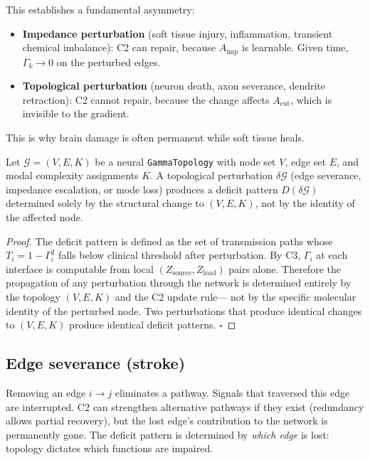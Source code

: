 \documentclass[aps,pre,twocolumn,superscriptaddress,floatfix]{revtex4-2}
\begin{document}
This establishes a fundamental asymmetry:
\begin{itemize}
  \item \textbf{Impedance perturbation}
    (soft tissue injury, inflammation, transient chemical
    imbalance): C2 can repair, because $A_{\text{imp}}$
    is learnable.
    Given time, $\Gamma_k \to 0$ on the perturbed edges.
  \item \textbf{Topological perturbation}
    (neuron death, axon severance, dendrite retraction):
    C2 cannot repair, because the change affects
    $A_{\text{cut}}$, which is invisible to the gradient.
\end{itemize}

\noindent
This is why brain damage is often permanent while soft
tissue heals.

\begin{theorem}
\label{thm:neural-topology}
Let $\mathcal{G} = (V, E, K)$ be a neural
\texttt{GammaTopology} with node set $V$,
edge set $E$, and modal complexity assignments $K$.
A topological perturbation $\delta\mathcal{G}$
(edge severance, impedance escalation, or mode loss)
produces a deficit pattern $D(\delta\mathcal{G})$
determined solely by the structural change to
$(V, E, K)$, not by the identity of the affected node.
\end{theorem}

\begin{proof}
The deficit pattern is defined as the set of
transmission paths whose $T_i = 1 - \Gamma_i^2$
falls below clinical threshold after perturbation.
By C3, $\Gamma_i$ at each interface is computable
from local $(Z_{\text{source}}, Z_{\text{load}})$
pairs alone.
Therefore the propagation of any perturbation
through the network is determined entirely by
the topology $(V, E, K)$ and the C2 update rule---
not by the specific molecular identity of the
perturbed node.
Two perturbations that produce identical changes
to $(V, E, K)$ produce identical deficit patterns. $\square$
\end{proof}


\subsection{Edge severance (stroke)}
\label{sec:stroke}

Removing an edge $i \to j$ eliminates a pathway.
Signals that traversed this edge are interrupted.
C2 can strengthen alternative pathways if they exist
(redundancy allows partial recovery), but the lost
edge's contribution to the network is permanently gone.
The deficit pattern is determined by \emph{which edge}
is lost: topology dictates which functions are impaired.
\end{document}
